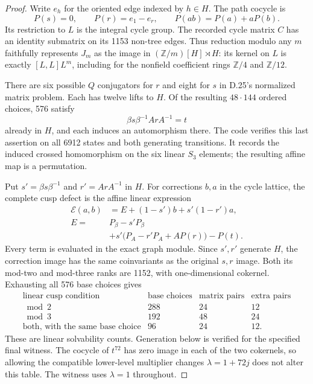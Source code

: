 \begin{proof}
Write $e_h$ for the oriented edge indexed by $h\in H$.
The path cocycle is
\[
 P(s)=0,\qquad P(r)=e_1-e_r,\qquad
 P(ab)=P(a)+aP(b).                                      \tag{D.37.9}
\]
Its restriction to $L$ is the integral cycle group. The
recorded cycle matrix $C$ has an identity submatrix on
its 1153 non-tree edges. Thus reduction modulo any $m$
faithfully represents $J_m$ as the image in
$(\mathbb Z/m)[H]\rtimes H$: its kernel on $L$ is exactly
$[L,L]L^m$, including for the nonfield coefficient rings
$\mathbb Z/4$ and $\mathbb Z/12$.

There are six possible $Q$ conjugators for $r$ and eight
for $s$ in D.25's normalized matrix problem. Each has
twelve lifts to $H$. Of the resulting $48\cdot144$
ordered choices, 576 satisfy
\[
 \beta s\beta^{-1}A rA^{-1}=t                           \tag{D.37.10}
\]
already in $H$, and each induces an automorphism there.
The code verifies this last assertion on all 6912 states
and both generating transitions. It records the induced
crossed homomorphism on the six linear $S_3$ elements;
the resulting affine map is a permutation.

Put $s'=\beta s\beta^{-1}$ and $r'=ArA^{-1}$ in $H$.
For corrections $b,a$ in the cycle lattice, the complete
cusp defect is the affine linear expression
\[
 \begin{split}
 \mathcal E(a,b)&=E+(1-s')b+s'(1-r')a,\\
 E={}&P_\beta-s'P_\beta\\
     &+s'\bigl(P_A-r'P_A+A P(r)\bigr)-P(t).
 \end{split}                                             \tag{D.37.11}
\]
Every term is evaluated in the exact graph module. Since
$s',r'$ generate $H$, the correction image has the same
coinvariants as the original $s,r$ image. Both its mod-two
and mod-three ranks are 1152, with one-dimensional
cokernel. Exhausting all 576 base choices gives
\[
\begin{array}{c|rrr}
 \text{linear cusp condition}&
 \text{base choices}&\text{matrix pairs}&\text{extra pairs}\\\hline
 \bmod2&288&24&12\\
 \bmod3&192&48&24\\
 \text{both, with the same base choice}&96&24&12.
\end{array}                                               \tag{D.37.12}
\]
These are linear solvability counts. Generation below is
verified for the specified final witness. The cocycle of
$t^{72}$ has zero image in each of the two cokernels, so
allowing the compatible lower-level multiplier changes
$\lambda=1+72j$ does not alter this table. The witness uses
$\lambda=1$ throughout.


\end{proof}
